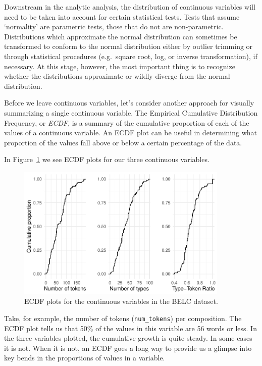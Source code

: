 \documentclass[
  letterpaper,
]{latex/krantz}
\begin{document}
Downstream in the analytic analysis, the distribution of continuous
variables will need to be taken into account for certain statistical
tests. Tests that assume `normality' are parametric tests, those that do
not are non-parametric. Distributions which approximate the normal
distribution can sometimes be transformed to conform to the normal
distribution either by outlier trimming or through statistical
procedures (e.g.~square root, log, or inverse transformation), if
necessary. At this stage, however, the most important thing is to
recognize whether the distributions approximate or wildly diverge from
the normal distribution.

Before we leave continuous variables, let's consider another approach
for visually summarizing a single continuous variable. The Empirical
Cumulative Distribution Frequency, or \emph{ECDF}, is a summary of the
cumulative proportion of each of the values of a continuous variable. An
ECDF plot can be useful in determining what proportion of the values
fall above or below a certain percentage of the data.

In Figure~\ref{fig-summarize-ecdf-belc} we see ECDF plots for our three
continuous variables.

\begin{figure}

{\centering \includegraphics[width=0.9\textwidth,height=\textheight]{./approaching-analysis_files/figure-pdf/fig-summarize-ecdf-belc-1.pdf}

}

\caption{\label{fig-summarize-ecdf-belc}ECDF plots for the continuous
variables in the BELC dataset.}

\end{figure}

Take, for example, the number of tokens (\texttt{num\_tokens}) per
composition. The ECDF plot tells us that 50\% of the values in this
variable are 56 words or less. In the three variables plotted, the
cumulative growth is quite steady. In some cases it is not. When it is
not, an ECDF goes a long way to provide us a glimpse into key bends in
the proportions of values in a variable.
\end{document}
